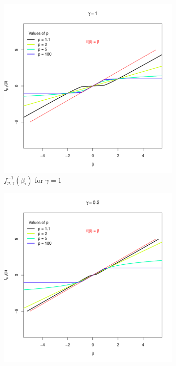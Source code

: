 \begin{figure}[H]
  \centering
  \begin{subfigure}{0.45\textwidth}
    \centering
    \includegraphics[width=\linewidth]{Images/Figures_Exercise_1/inverse_function_1.pdf} %
    \caption{$f_{p, \gamma}^{-1}(\beta_i)$ for $\gamma = 1$}
    \label{fig:inv_1}
  \end{subfigure}
  \hfill
  \begin{subfigure}{0.45\textwidth}
    \centering
    \includegraphics[width=\linewidth]{Images/Figures_Exercise_1/inverse_function_0.2.pdf} %

\end{subfigure}
\end{figure}
